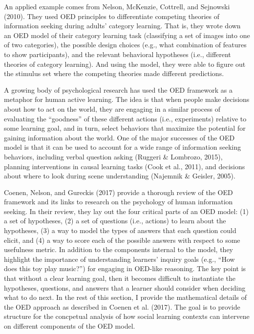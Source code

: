 \documentclass[english,floatsintext,man]{apa6}
\theoremstyle{definition}
\theoremstyle{definition}
\theoremstyle{definition}
\theoremstyle{remark}
\begin{document}
An applied example comes from Nelson, McKenzie, Cottrell, and Sejnowski
(2010). They used OED principles to differentiate competing theories of
information seeking during adults' category learning. That is, they
wrote down an OED model of their category learning task (classifying a
set of images into one of two categories), the possible design choices
(e.g., what combination of features to show participants), and the
relevant behavioral hypotheses (i.e., different theories of category
learning). And using the model, they were able to figure out the
stimulus set where the competing theories made different predictions.

A growing body of psychological research has used the OED framework as a
metaphor for human active learning. The idea is that when people make
decisions about how to act on the world, they are engaging in a similar
process of evaluating the \enquote{goodness} of these different actions
(i.e., experiments) relative to some learning goal, and in turn, select
behaviors that maximize the potential for gaining information about the
world. One of the major successes of the OED model is that it can be
used to account for a wide range of information seeking behaviors,
including verbal question asking (Ruggeri \& Lombrozo, 2015), planning
interventions in causal learning tasks (Cook et al., 2011), and
decisions about where to look during scene understanding (Najemnik \&
Geisler, 2005).

Coenen, Nelson, and Gureckis (2017) provide a thorough review of the OED
framework and its links to research on the psychology of human
information seeking. In their review, they lay out the four critical
parts of an OED model: (1) a set of hypotheses, (2) a set of questions
(i.e., actions) to learn about the hypotheses, (3) a way to model the
types of answers that each question could elicit, and (4) a way to score
each of the possible answers with respect to some usefulness metric. In
addition to the components internal to the model, they highlight the
importance of understanding learners' inquiry goals (e.g., \enquote{How
does this toy play music?}) for engaging in OED-like reasoning. The key
point is that without a clear learning goal, then it becomes difficult
to instantiate the hypotheses, questions, and answers that a learner
should consider when deciding what to do next. In the rest of this
section, I provide the mathematical details of the OED approach as
described in Coenen et al. (2017). The goal is to provide structure for
the concpetual analysis of how social learning contexts can intervene on
different components of the OED model.
\end{document}
